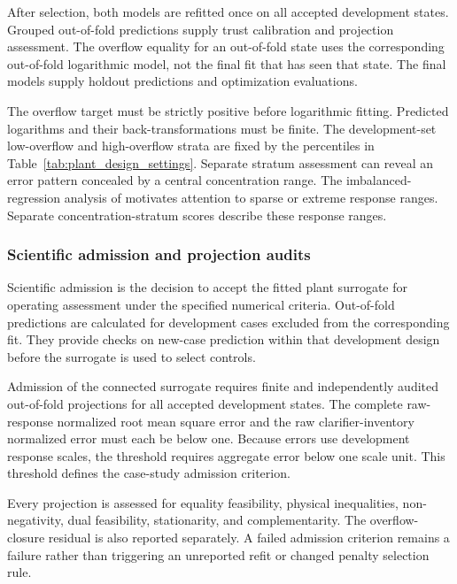 After selection, both models are refitted once on all accepted development states. Grouped out-of-fold predictions supply trust calibration and projection assessment. The overflow equality for an out-of-fold state uses the corresponding out-of-fold logarithmic model, not the final fit that has seen that state. The final models supply holdout predictions and optimization evaluations.

The overflow target must be strictly positive before logarithmic fitting. Predicted logarithms and their back-transformations must be finite. The development-set low-overflow and high-overflow strata are fixed by the percentiles in Table~\ref{tab:plant_design_settings}. Separate stratum assessment can reveal an error pattern concealed by a central concentration range. The imbalanced-regression analysis of \citet{Shahbazi2026} motivates attention to sparse or extreme response ranges. Separate concentration-stratum scores describe these response ranges.

\subsubsection{Scientific admission and projection audits}

Scientific admission is the decision to accept the fitted plant surrogate for operating assessment under the specified numerical criteria. Out-of-fold predictions are calculated for development cases excluded from the corresponding fit. They provide checks on new-case prediction within that development design before the surrogate is used to select controls.

Admission of the connected surrogate requires finite and independently audited out-of-fold projections for all accepted development states. The complete raw-response normalized root mean square error and the raw clarifier-inventory normalized error must each be below one. Because errors use development response scales, the threshold requires aggregate error below one scale unit. This threshold defines the case-study admission criterion.

Every projection is assessed for equality feasibility, physical inequalities, non-negativity, dual feasibility, stationarity, and complementarity. The overflow-closure residual is also reported separately. A failed admission criterion remains a failure rather than triggering an unreported refit or changed penalty selection rule.

